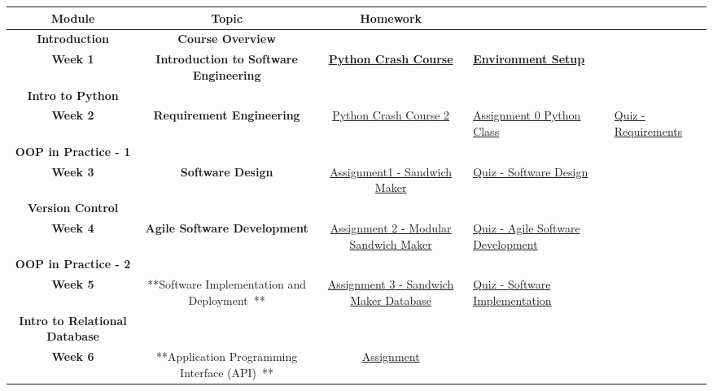 \documentclass[
]{article}
\begin{document}
\begin{longtable}[]{@{}cccll@{}}
\toprule\noalign{}
\textbf{Module} & \textbf{Topic} & \textbf{Homework} & & \\
\midrule\noalign{}
\endhead
\bottomrule\noalign{}
\endlastfoot
\textbf{Introduction} & \textbf{Course Overview} & ~ & & \\
\textbf{Week 1} & \textbf{Introduction to Software Engineering} &
\href{https://instructure.charlotte.edu/courses/264138/modules/items/8170989}{\textbf{Python
Crash Course}} &
\href{https://instructure.charlotte.edu/courses/264138/assignments/2981563}{\textbf{Environment
Setup}} & \\
\textbf{Intro to Python} & & & & \\
\textbf{Week 2} & \textbf{Requirement Engineering} &
\href{https://instructure.charlotte.edu/courses/264138/pages/python-crash-course-part2?wrap=1}{Python
Crash Course 2} &
\href{https://instructure.charlotte.edu/courses/264138/assignments/2981587?wrap=1}{Assignment
0 Python Class} &
\href{https://instructure.charlotte.edu/courses/264138/quizzes/636082?wrap=1}{Quiz
- Requirements} \\
\textbf{OOP in Practice - 1} & & & & \\
\textbf{Week 3} & \textbf{Software Design} &
\href{https://instructure.charlotte.edu/courses/264138/assignments/2981548?wrap=1}{Assignment1
- Sandwich Maker} &
\href{https://instructure.charlotte.edu/courses/264138/quizzes/636064?wrap=1}{Quiz
- Software Design} & \\
\textbf{Version Control} & & & & \\
\textbf{Week 4} & \textbf{Agile Software Development} &
\href{https://instructure.charlotte.edu/courses/264138/assignments/2981550?wrap=1}{Assignment
2 - Modular Sandwich Maker} &
\href{https://instructure.charlotte.edu/courses/264138/assignments/2981512?wrap=1}{Quiz
- Agile Software Development} & \\
\textbf{OOP in Practice - 2} & & & & \\
\textbf{Week 5} & **Software Implementation and Deployment~** &
\href{https://instructure.charlotte.edu/courses/264138/assignments/2981552?wrap=1}{Assignment
3 - Sandwich Maker Database} &
\href{https://instructure.charlotte.edu/courses/264138/assignments/2981534?wrap=1}{Quiz
- Software Implementation} & \\
\textbf{Intro to Relational Database} & & & & \\
\textbf{Week 6} & **Application Programming Interface (API)~** &
\href{https://instructure.charlotte.edu/courses/264138/assignments/2981553?wrap=1}{Assignment
}
\end{longtable}
\end{document}
